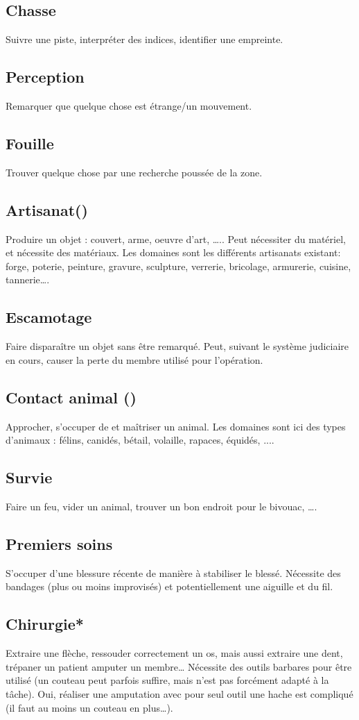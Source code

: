 \documentclass[10pt,a4paper,twocolumn]{book}
\begin{document}
\subsection*{Chasse}
Suivre une piste, interpréter des indices, identifier une empreinte.
\subsection*{Perception}
Remarquer que quelque chose est étrange/un mouvement.
\subsection*{Fouille}
Trouver quelque chose par une recherche poussée de la zone.
\subsection*{Artisanat()}
Produire un objet : couvert, arme, oeuvre d’art, ….. Peut nécessiter du matériel, et nécessite des matériaux. Les domaines sont les différents artisanats existant: forge, poterie, peinture, gravure, sculpture, verrerie, bricolage, armurerie, cuisine, tannerie….
\subsection*{Escamotage}
Faire disparaître un objet sans être remarqué. Peut, suivant le système judiciaire en cours, causer la perte du membre utilisé pour l’opération.
\subsection*{Contact animal ()}
Approcher, s’occuper de et maîtriser un animal. Les domaines sont ici des types d’animaux : félins, canidés, bétail, volaille, rapaces, équidés, ....
\subsection*{Survie}
Faire un feu, vider un animal, trouver un bon endroit pour le bivouac, ….
\subsection*{Premiers soins}
S’occuper d’une blessure récente de manière à stabiliser le blessé. Nécessite des bandages (plus ou moins improvisés) et potentiellement une aiguille et du fil.
\subsection*{Chirurgie* }
Extraire une flèche, ressouder correctement un os, mais aussi extraire une dent, trépaner un patient amputer un membre… Nécessite des outils barbares pour être utilisé (un couteau peut parfois suffire, mais n’est pas forcément adapté à la tâche). Oui, réaliser une amputation avec pour seul outil une hache est compliqué (il faut au moins un couteau en plus…).
\end{document}
